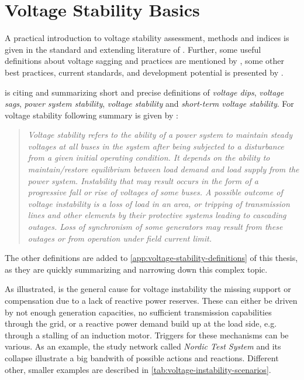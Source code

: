 \section{Voltage Stability Basics}
\label{sec:voltage-stability}

A practical introduction to voltage stability assessment, methods and indices is given in the standard and extending literature of \textcite{danish_2015,cutsem_1998}. Further, some useful definitions about voltage sagging and practices are mentioned by \textcite{shoup_2004}, some other best practices, current standards, and development potential is presented by \textcite{rueda-torres_2024}.

\textcite{shoup_2004} is citing and summarizing short and precise definitions of \textit{voltage dips}, \textit{voltage sags}, \textit{power system stability}, \textit{voltage stability} and \textit{short-term voltage stability}.
For voltage stability following summary is given by \textcite{shoup_2004}:
\begin{quote}\itshape
    \glqq Voltage stability refers to the ability of a power system to maintain steady voltages at all buses in the system after being subjected to a disturbance from a given initial operating condition. 
    It depends on the ability to maintain/restore equilibrium between load demand and load supply from the power system. 
    Instability that may result occurs in the form of a progressive fall or rise of voltages of some buses. 
    A possible outcome of voltage instability is a loss of load in an area, or tripping of transmission lines and other elements by their protective systems leading to cascading outages. 
    Loss of synchronism of some generators may result from these outages or from operation under field current limit.\grqq
\end{quote}
The other definitions are added to \autoref{app:voltage-stability-definitions} of this thesis, as they are quickly summarizing and narrowing down this complex topic.

As illustrated, is the general cause for voltage instability the missing support or compensation due to a lack of reactive power reserves.
These can either be driven by not enough generation capacities, no sufficient transmission capabilities through the grid, or a reactive power demand build up at the load side, e.g. through a stalling of an induction motor.
Triggers for these mechanisms can be various.
As an example, the study network called \textit{Nordic Test System} and its collapse \autocite{vancutsem_2020} illustrate a big bandwith of possible actions and reactions.
Different other, smaller examples are described in \autoref{tab:voltage-instability-scenarios}.

